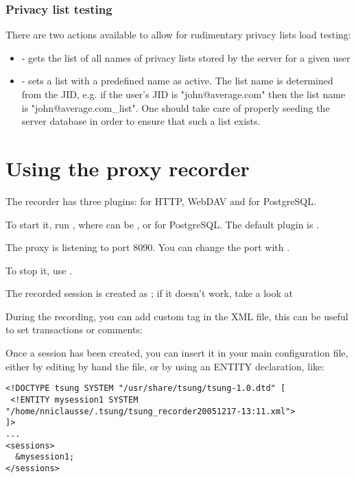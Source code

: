 \documentclass{TSUNG-en}
\begin{document}
\subsubsection{Privacy list testing}

There are two actions available to allow for rudimentary privacy lists
load testing:
\begin{itemize}
\item {} - gets the list of all names
of privacy lists stored by the server for a given user
\item {} - sets a list with a predefined
name as active. The list name is determined from the JID,
e.g. if the user's JID is "john@average.com" then the list name
is "john@average.com\_list". One should take care of properly seeding
the server database in order to ensure that such a list exists.
\end{itemize}

\section{Using the proxy recorder}

The recorder has three plugins: for HTTP, WebDAV and for PostgreSQL.

To start it, run , where  can be
,  or   for PostgreSQL. The default plugin is .


The proxy is listening to port 8090. You can change the port with
.

To stop it, use .

The recorded session is created as
; if it doesn't work,
take a look at 

During the recording, you can add custom tag in the XML file, this can
be useful to set transactions or comments:

Once a session has been created, you can insert it in your main configuration
file, either by editing by hand the file, or by using an ENTITY
declaration, like:

\begin{Verbatim}
<!DOCTYPE tsung SYSTEM "/usr/share/tsung/tsung-1.0.dtd" [
 <!ENTITY mysession1 SYSTEM "/home/nniclausse/.tsung/tsung_recorder20051217-13:11.xml">
]>
...
<sessions>
  &mysession1;
</sessions>
\end{Verbatim}
\end{document}
